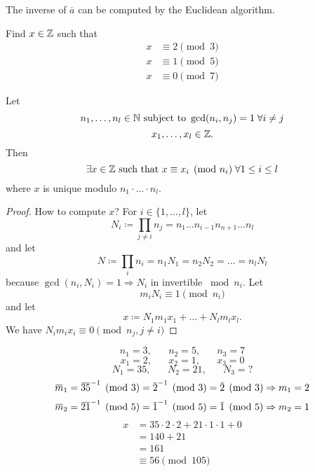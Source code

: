 \documentclass[NumTh.tex]{subfiles}
\begin{document}
\begin{rem}
The inverse of $\overbar{a}$ can be computed by the Euclidean algorithm.
\end{rem}

\begin{ex}
Find $x \in \mathbb{Z}$ such that 
\begin{align}
x &\equiv 2 \pmod{3}\\
x &\equiv 1 \pmod{5}\\
x &\equiv 0 \pmod{7}
\end{align}
\end{ex}

\begin{theorem} Let
\[ n_1,\dots,n_l \in \mathbb{N} \text{ subject to } \gcd (n_i,n_j) = 1 \;\forall i\neq j \]
\[ x_1, \dots, x_l \in \mathbb{Z} \text{.} \]
Then
\[ \exists x \in \mathbb{Z} \text{ such that } x \equiv x_i \pmod{n_i} \; \forall 1\leq i \leq l \]
where $x$ is unique modulo $n_1 \cdot \dots \cdot n_l$.
\end{theorem}

\begin{proof}
How to compute $x$? For $i \in \{1,\dots,l\}$, let
\[ N_i \coloneq \prod_{j \neq i} n_j = n_1 \dots n_{i-1} n_{n+1} \dots n_l \]
and let
\[ N \coloneq \prod_i n_i = n_1 N_1 = n_2 N_2 = \dots = n_l N_l \]
because $\gcd(n_i,N_i) = 1 \Rightarrow N_i$ in invertible $\bmod n_i$. Let
\[ m_i N_i \equiv 1 \pmod{n_i} \]
and let
\[ x \coloneq N_1 m_1 x_1 + \dots + N_l m_l x_l \text{.} \]
We have $N_i m_i x_i \equiv 0 \pmod{n_j, j\neq i}$%
\end{proof}

\begin{ex}
  \[
    n_1 = 3, \hspace{20pt} n_2 = 5, \hspace{20pt} n_3 = 7
  \] \[
    x_1 = 2, \hspace{20pt} x_2 = 1, \hspace{20pt} x_3 = 0
  \] \[
    N_1 = 35, \hspace{20pt} N_2 = 21, \hspace{20pt} N_3 = ?
  \]
  \[ \overbar{m}_1 = \inv{\overbar{35}} \pmod{3} = \inv{\overbar{2}} \pmod{3} = \overbar{2} \pmod{3} \Rightarrow m_1 = 2 \]
  \[ \overbar{m}_2 = \inv{\overbar{21}} \pmod{5} = \inv{\overbar{1}} \pmod{5} = \overbar{1} \pmod{5} \Rightarrow m_2 = 1 \]
  \begin{align*}
    x &= 35 \cdot 2 \cdot 2 + 21 \cdot 1 \cdot 1 + 0 \\
      &= 140 + 21 \\
      &= 161 \\
      &\equiv 56 \pmod{105}
  \end{align*}
\end{ex}
\end{document}
